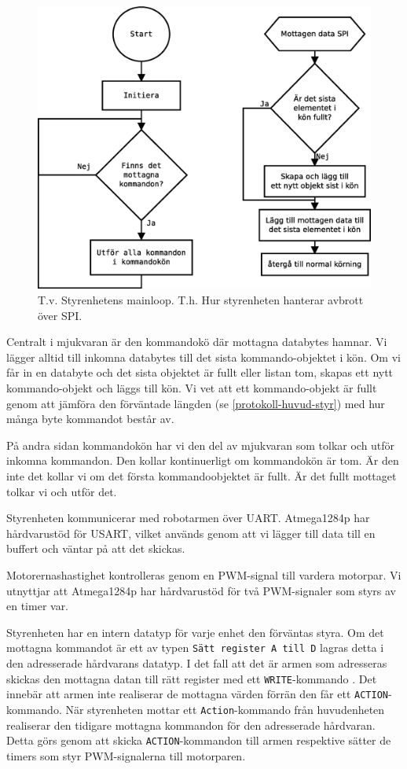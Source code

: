 \begin{figure}[h!]
	\centering
	\includegraphics[scale=0.4]{grafik/styr-mjukvara}
	\caption{T.v. Styrenhetens mainloop. T.h. Hur styrenheten hanterar avbrott över SPI.} \label{styr-mjukvara}
\end{figure}

Centralt i mjukvaran är den kommandokö där mottagna databytes hamnar. Vi lägger alltid till inkomna databytes till det sista kommando-objektet i kön. Om vi får in en databyte och det sista objektet är fullt eller listan tom, skapas ett nytt kommando-objekt och läggs till kön. Vi vet att ett kommando-objekt är fullt genom att jämföra den förväntade längden (se \ref{protokoll-huvud-styr}) med hur många byte kommandot består av.

På andra sidan kommandokön har vi den del av mjukvaran som tolkar och utför inkomna kommandon. Den kollar kontinuerligt om kommandokön är tom. Är den inte det kollar vi om det första kommandoobjektet är fullt. Är det fullt mottaget tolkar vi och utför det.

Styrenheten kommunicerar med robotarmen över UART. Atmega1284p har hårdvarustöd för USART, vilket används genom att vi lägger till data till en buffert och väntar på att det skickas.

Motorernashastighet kontrolleras genom en PWM-signal till vardera motorpar. Vi utnyttjar att Atmega1284p har hårdvarustöd för två PWM-signaler som styrs av en timer var.

Styrenheten har en intern datatyp för varje enhet den förväntas styra. Om det mottagna kommandot är ett av typen \texttt{Sätt register A till D} lagras detta i den adresserade hårdvarans datatyp. I det fall att det är armen som adresseras skickas den mottagna datan till rätt register med ett \texttt{WRITE}-kommando \cite{servo}. Det innebär att armen inte realiserar de mottagna värden förrän den får ett \texttt{ACTION}-kommando. När styrenheten mottar ett \texttt{Action}-kommando från huvudenheten realiserar den tidigare mottagna kommandon för den adresserade hårdvaran. Detta görs genom att skicka \texttt{ACTION}-kommandon till armen respektive sätter de timers som styr PWM-signalerna till motorparen.
